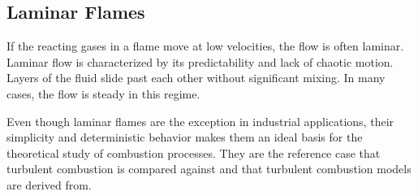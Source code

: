 \subsection{Laminar Flames} %
\label{sub:laminar_flames}
%
If the reacting gases in a flame move at low velocities, the flow is often
laminar.
%
Laminar flow is characterized by its predictability and lack of chaotic motion.
%
Layers of the fluid slide past each other without significant mixing.
%
In many cases, the flow is steady in this regime.
%

%
Even though laminar flames are the exception in industrial applications, their
simplicity and deterministic behavior makes them an ideal basis for the
theoretical study of combustion processes.
%
They are the reference case that turbulent combustion is compared against and
that turbulent combustion models are derived from.
%
